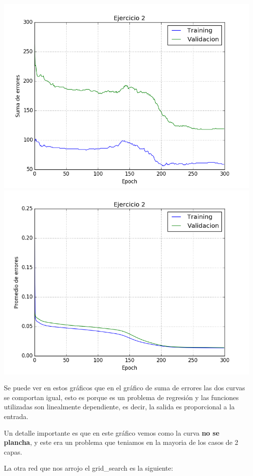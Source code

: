 \includegraphics[scale=0.4]{img/ej200050915sum}
\includegraphics[scale=0.4]{img/ej200050915mean}

Se puede ver en estos gráficos que en el gráfico de suma de errores las dos curvas se comportan igual, esto es porque es un problema de regresión y las funciones utilizadas son linealmente dependiente, es decir, la salida es proporcional a la entrada.

Un detalle importante es que en este gráfico vemos como la curva \textbf{no se plancha}, y este era un problema que teniamos en la mayoria de los casos de 2 capas. 

La otra red que nos arrojo el grid\_search es la siguiente:

